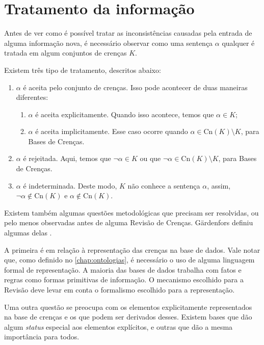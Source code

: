 \section{Tratamento da informação}

Antes de ver como é possível tratar as inconsistências causadas pela entrada de alguma informação nova, é necessário observar como uma sentença $ \alpha $ qualquer é tratada em algum conjuntos de crenças $ K $.

Existem três tipo de tratamento, descritos abaixo:

\begin{enumerate}
	\item $ \alpha $ é aceita pelo conjunto de crenças. Isso pode acontecer de duas maneiras diferentes:
	\begin{enumerate}
		\item $ \alpha $ é aceita explicitamente. Quando isso acontece, temos que $ \alpha \in K $;
		\item $ \alpha $ é aceita implicitamente. Esse caso ocorre quando $ \alpha \in \text{Cn}(K) \setminus K $, para Bases de Crenças.
	\end{enumerate}
	\item $ \alpha $ é rejeitada. Aqui, temos que $ \lnot \alpha \in K $ ou que $ \lnot \alpha \in \text{Cn}(K) \setminus K $, para Bases de Crenças. 
	\item $ \alpha $ é indeterminada. Deste modo, $ K $ não conhece a sentença $ \alpha $, assim, $ \lnot \alpha \notin \text{Cn}(K) $ e $ \alpha \notin \text{Cn}(K) $.
\end{enumerate}

Existem também algumas questões metodológicas que precisam ser resolvidas, ou pelo menos observadas antes de alguma Revisão de Crenças. Gärdenfors definiu algumas delas  \citep{revisaoGardenfors2}.

A primeira é em relação à representação das crenças na base de dados. Vale notar que, como definido no \autoref{chap:ontologias}, é necessário o uso de alguma linguagem formal de representação. A maioria das bases de dados trabalha com fatos e regras como formas primitivas de informação. O mecanismo escolhido para a Revisão deve levar em conta o formalismo escolhido para a representação.

Uma outra questão se preocupa com os elementos explicitamente representados na base de crenças e os que podem ser derivados desses. Existem bases que dão algum \textit{status} especial aos elementos explícitos, e outras que dão a mesma importância para todos. 

